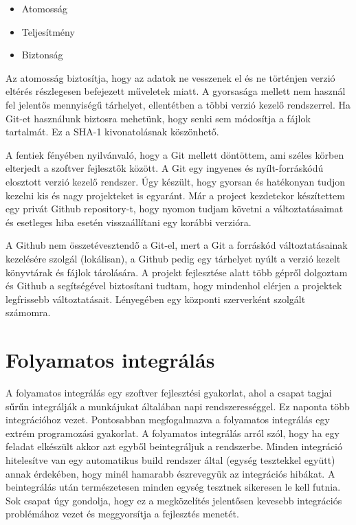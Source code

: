 \documentclass{thesis-ekf}
\theoremstyle{definition}
\theoremstyle{remark}
\begin{document}
\begin{itemize}
	\item Atomosság
	\item Teljesítmény
	\item Biztonság
\end{itemize}

Az atomosság biztosítja, hogy az adatok ne vesszenek el és ne történjen verzió eltérés részlegesen befejezett műveletek miatt.
A gyorsasága mellett nem használ fel jelentős mennyiségű tárhelyet, ellentétben a többi verzió kezelő rendszerrel.
Ha Git-et használunk biztosra mehetünk, hogy senki sem módosítja a fájlok tartalmát. Ez a SHA-1 kivonatolásnak köszönhető.\cite{git}

A fentiek fényében nyilvánvaló, hogy a Git mellett döntöttem, ami széles körben elterjedt a szoftver fejlesztők között.
A Git egy ingyenes és nyílt-forráskódú elosztott verzió kezelő rendszer. Úgy készült, hogy gyorsan és hatékonyan tudjon kezelni kis és nagy projekteket is egyaránt.
Már a project kezdetekor készítettem egy privát Github repository-t, hogy nyomon tudjam követni a változtatásaimat és esetleges hiba esetén visszaállítani egy korábbi verzióra.

A Github nem összetévesztendő a Git-el, mert a Git a forráskód változtatásainak kezelésére szolgál (lokálisan), a Github pedig egy tárhelyet nyúlt a verzió kezelt könyvtárak és fájlok tárolására.
A projekt fejlesztése alatt több gépről dolgoztam és Github a segítségével biztosítani tudtam, hogy mindenhol elérjen a projektek legfrissebb változtatásait.
Lényegében egy központi szerverként szolgált számomra.

\section{Folyamatos integrálás}

A folyamatos integrálás egy szoftver fejlesztési gyakorlat, ahol a csapat tagjai sűrűn integrálják a munkájukat általában napi rendszerességgel. 
Ez naponta több integrációhoz vezet. Pontosabban megfogalmazva a folyamatos integrálás egy extrém programozási gyakorlat.
A folyamatos integrálás arról szól, hogy ha egy feladat elkészült akkor azt egyből beintegráljuk a rendszerbe.
Minden integráció hitelesítve van egy automatikus build rendszer által (egység tesztekkel együtt) annak érdekében, hogy minél hamarabb észrevegyük az integrációs hibákat.
A beintegrálás után természetesen minden egység tesztnek sikeresen le kell futnia.
Sok csapat úgy gondolja, hogy ez a megközelítés jelentősen kevesebb integrációs problémához vezet és meggyorsítja a fejlesztés menetét.\cite{continuous_integration}
\end{document}
